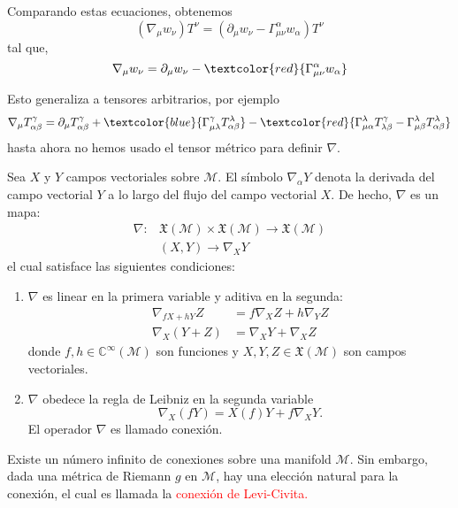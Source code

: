 \documentclass[../main]{subfiles}
\begin{document}
\begin{adjustwidth}{0pt}{-100pt}
Comparando estas ecuaciones, obtenemos
\begin{equation}
    (\nabla_{\mu} w_{\nu})T^{\nu}=(\partial_{\mu} w_{\nu}-\Gamma^{\alpha}_{\mu\nu}w_{\alpha})T^{\nu}
\end{equation}
tal que,
\begin{equation}
    \nabla_{\mu} w_{\nu}=\partial_{\mu} w_{\nu}-\textcolor{red}{\Gamma^{\alpha}_{\mu\nu}w_{\alpha}}
\end{equation}

Esto generaliza a tensores arbitrarios, por ejemplo 
\begin{equation}
    \nabla_{\mu} T^{\gamma}_{\alpha\beta}=\partial_{\mu} T_{\alpha\beta}^{\gamma}+\textcolor{blue}{\Gamma^{\gamma}_{\mu\lambda} T^{\lambda}_{\alpha\beta}}-\textcolor{red}{\Gamma^{\lambda}_{\mu\alpha}T^{\gamma}_{\lambda\beta}-\Gamma^{\lambda}_{\mu\beta}T^{\lambda}_{\alpha\beta}}
\end{equation}
hasta ahora no hemos usado el tensor métrico para definir $\nabla$.

 Sea $X$ y $Y$ campos vectoriales sobre $\mathcal{M}$. El símbolo $\nabla_{\alpha} Y$ denota la derivada del campo vectorial $Y$ a lo largo del flujo del campo vectorial $X$. De hecho, $\nabla$ es un mapa:
\begin{equation}
    \begin{aligned}
        \nabla: &\mathfrak{X}(\mathcal{M}) \times \mathfrak{X}(\mathcal{M}) \rightarrow \mathfrak{X}(\mathcal{M})\\
        &(X, Y) \rightarrow \nabla_X Y
    \end{aligned}
\end{equation}
el cual satisface las siguientes condiciones:
\begin{enumerate}
    \item $\nabla$ es linear en la primera variable y aditiva en la segunda:
    \begin{align}
        \nabla_{fX+hY}Z&=f\nabla_X Z+h\nabla_Y Z\\
        \nabla_X (Y+Z)&=\nabla_X Y+\nabla_X Z
    \end{align}
    donde $f, h\in \mathbb{C}^{\infty}(\mathcal{M})$ son funciones y $X, Y, Z \in \mathfrak{X}(\mathcal{M})$ son campos vectoriales.
    \item $\nabla$ obedece la regla de Leibniz en la segunda variable 
    \begin{equation}
        \nabla_X (fY)=X(f)Y+f\nabla_X Y.
    \end{equation}
    El operador $\nabla$ es llamado conexión.
\end{enumerate}
Existe un número infinito de conexiones sobre una manifold $\mathcal{M}$. Sin embargo, dada una métrica de Riemann $g$ en $\mathcal{M}$, hay una elección natural para la conexión, el cual es llamada la \textcolor{red}{conexión de Levi-Civita.}


\end{adjustwidth}
\end{document}
